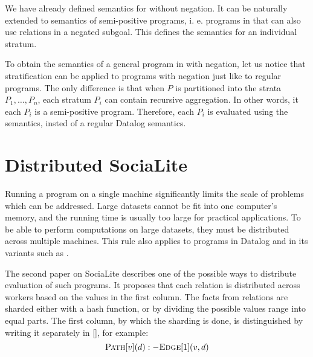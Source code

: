 We have already defined semantics for \datalogra without negation. It can be naturally extended to semantics of semi-positive \datalogra programs, i. e. programs in \datalogra that can also use \edb relations in a negated subgoal. This defines the semantics for an individual stratum.

To obtain the semantics of a general program in \datalogra with negation, let us notice that stratification can be applied to \datalogra programs with negation just like to regular \datalogneg programs. The only difference is that when $P$ is partitioned into the strata $P_1, \dots, P_n$, each stratum $P_i$ can contain recursive aggregation. In other words, it each $P_i$ is a semi-positive \datalogra program. Therefore, each $P_i$ is evaluated using the \datalogra semantics, insted of a regular Datalog semantics.


\section{Distributed SociaLite}\label{s:distributed}
Running a program on a single machine significantly limits the scale of problems which can be addressed. Large datasets cannot be fit into one computer's memory, and the running time is usually too large for practical applications. To be able to perform computations on large datasets, they must be distributed across multiple machines. This rule also applies to programs in Datalog and in its variants such as \datalogra.

The second paper on SociaLite \cite{distsoc} describes one of the possible ways to distribute evaluation of such programs. It proposes that each relation is distributed across workers based on the values in the first column. The facts from relations are sharded either with a hash function, or by dividing the possible values range into equal parts. The first column, by which the sharding is done, is distinguished by writing it separately in [], for example:
$$\textsc{Path}[v](d) :- \textsc{Edge}[1](v, d)$$

